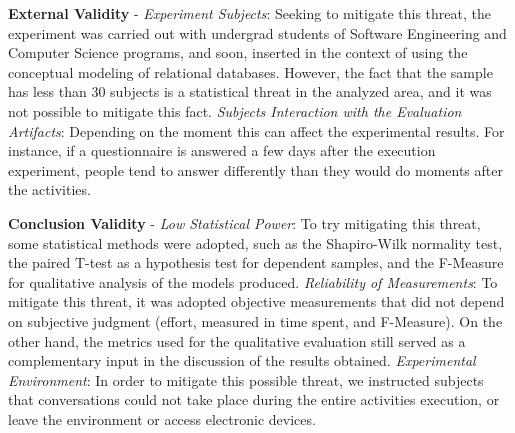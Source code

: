 \documentclass[a4paper,twoside,anonymous]{article}
\begin{document}
\textbf{External Validity} - 
\textit{Experiment Subjects}:
Seeking to mitigate this threat, the experiment was carried out with undergrad students of Software Engineering and Computer Science programs, and soon, inserted in the context of using the conceptual modeling of relational databases.
However, the fact that the sample has less than 30 subjects is a statistical threat in the analyzed area, and it was not possible to mitigate this fact.
\textit{Subjects Interaction with the Evaluation Artifacts}:
Depending on the moment this can affect the experimental results.
For instance, if a questionnaire is answered a few days after the execution experiment, people tend to answer differently than they would do moments after the activities.

\textbf{Conclusion Validity} - 
\textit{Low Statistical Power}:
To try mitigating this threat, some statistical methods were adopted, such as the Shapiro-Wilk normality test, the paired T-test as a hypothesis test for dependent samples, and the F-Measure for qualitative analysis of the models produced.
\textit{Reliability of Measurements}:
To mitigate this threat, it was adopted objective measurements that did not depend on subjective judgment (effort, measured in time spent, and F-Measure).
On the other hand, the metrics used for the qualitative evaluation still served as a complementary input in the discussion of the results obtained.
\textit{Experimental Environment}:
In order to mitigate this possible threat, we instructed subjects that conversations could not take place during the entire activities execution, or leave the environment or access electronic devices.
\end{document}
